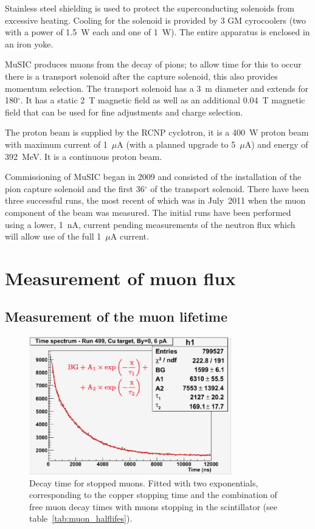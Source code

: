 \documentclass[a4paper]{jpconf}
\begin{document}
Stainless steel shielding is used to protect the superconducting solenoids from excessive heating. Cooling for the solenoid is provided by 3 GM cyrocoolers (two with a power of 1.5~W each and one of 1~W). The entire apparatus is enclosed in an iron yoke.  

MuSIC produces muons from the decay of pions; to allow time for this to occur there is a transport solenoid after the capture solenoid, this also provides momentum selection. The transport solenoid has a 3~m diameter and extends for 180$^{\circ}$. It has a static 2~T magnetic field as well as an additional 0.04~T magnetic field that can be used for fine adjustments and charge selection.

The proton beam is supplied by the RCNP cyclotron, it is a 400~W proton beam with maximum current of 1~$\mu$A (with a planned upgrade to 5~$\mu$A) and energy of 392~MeV. It is a continuous proton beam.

Commissioning of MuSIC began in 2009 and consisted of the installation of the pion capture solenoid and the first 36$^{\circ}$ of the transport solenoid. There have been three successful runs, the most recent of which was in July~2011 when the muon component of the beam was measured. The initial runs have been performed using a lower, 1~nA, current pending measurements of the neutron flux which will allow use of the full 1~$\mu$A current.



\section{Measurement of muon flux}
\subsection{Measurement of the muon lifetime}
\begin{figure}[htbp]
    \centering
        \includegraphics[height=6cm]{images/muon_decay.png}
\caption{Decay time for stopped muons. Fitted with two exponentials, corresponding to the copper stopping time and the combination of free muon decay times with muons stopping in the scintillator (see table~\ref{tab:muon_halflifes}).}
    \label{fig:muon_decay}
\end{figure}
\end{document}

